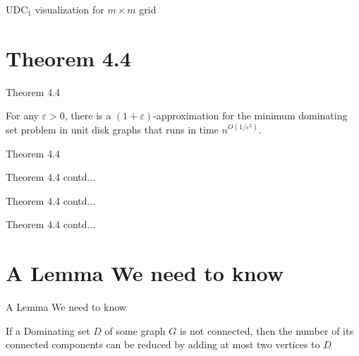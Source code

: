 \documentclass{beamer}
\begin{document}
\begin{frame}{UDC$_1$ visualization for $m \times m$ grid}



\end{frame}



\section{Theorem 4.4}

\begin{frame}

\begin{block}{Theorem 4.4}

    For any $\varepsilon > 0$, there is a $(1 + \varepsilon)$-approximation for the minimum dominating set problem in unit disk graphs that runs in time $n^{O(1/\varepsilon^2)}$.

\end{block}

\end{frame}

\begin{frame}{Theorem 4.4}

    
    
\end{frame}

\begin{frame}{Theorem 4.4 contd...}

    
    
\end{frame}

\begin{frame}{Theorem 4.4 contd...}

    
    
\end{frame}

\begin{frame}{Theorem 4.4 contd...}

    
    
\end{frame}

\section{ A Lemma We need to know } 

\begin{frame}

    \begin{block}{A Lemma We need to know}

        If a Dominating set $D$ of some graph $G$ is not connected, then the number of its connected components can be reduced by adding at most two vertices to $D$

    \end{block}
    
\end{frame}
\end{document}
